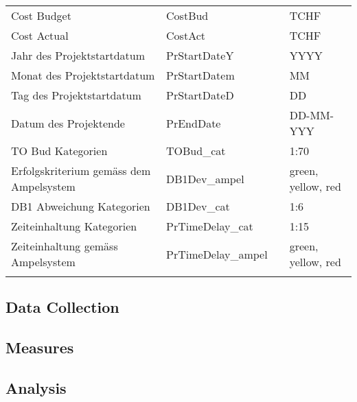 \documentclass[11pt]{article}
\begin{document}
\begin{landscape}
\begin{center}
\begin{longtable}{p{6cm}|p{4cm}|p{6cm}|p{3cm}}
		Cost Budget & CostBud &       & TCHF \\
		Cost Actual & CostAct &       & TCHF \\
		Jahr des Projektstartdatum & PrStartDateY &       & YYYY \\
		Monat des Projektstartdatum & PrStartDatem &       & MM \\
		Tag des Projektstartdatum & PrStartDateD &       & DD \\
		Datum des Projektende & PrEndDate &       & DD-MM-YYY \\
		TO Bud Kategorien & TOBud\_cat &       & {1:70} \\
		Erfolgskriterium gemäss dem Ampelsystem & DB1Dev\_ampel &       & {green, yellow, red} \\
		DB1 Abweichung Kategorien & DB1Dev\_cat &       & {1:6} \\
		Zeiteinhaltung Kategorien & PrTimeDelay\_cat &       & {1:15} \\
		Zeiteinhaltung gemäss Ampelsystem & PrTimeDelay\_ampel &       & {green, yellow, red} \\
		
	\label{tab:addlabel}%
\end{longtable}%
\end{center}
\end{landscape}
\subsection*{Data Collection}
\subsection*{Measures}
\subsection*{Analysis}
\end{document}
